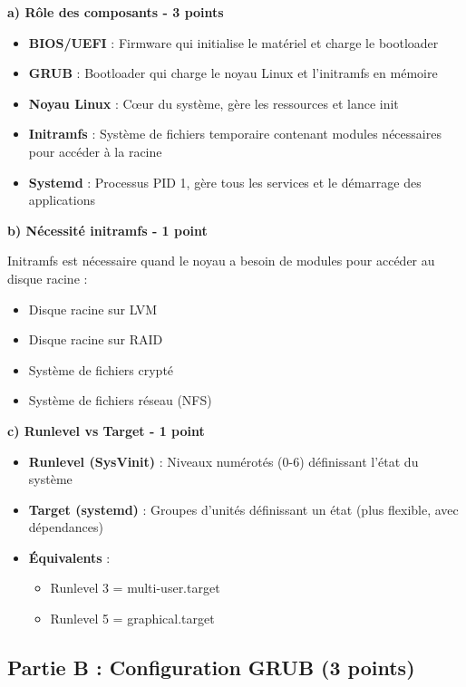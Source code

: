 \documentclass[12pt,a4paper]{article}
\begin{document}
\begin{answerbox}
\textbf{a) Rôle des composants - 3 points}

\begin{itemize}
    \item \textbf{BIOS/UEFI} : Firmware qui initialise le matériel et charge le bootloader
    \item \textbf{GRUB} : Bootloader qui charge le noyau Linux et l'initramfs en mémoire
    \item \textbf{Noyau Linux} : Cœur du système, gère les ressources et lance init
    \item \textbf{Initramfs} : Système de fichiers temporaire contenant modules nécessaires pour accéder à la racine
    \item \textbf{Systemd} : Processus PID 1, gère tous les services et le démarrage des applications
\end{itemize}

\textbf{b) Nécessité initramfs - 1 point}

Initramfs est nécessaire quand le noyau a besoin de modules pour accéder au disque racine :
\begin{itemize}
    \item Disque racine sur LVM
    \item Disque racine sur RAID
    \item Système de fichiers crypté
    \item Système de fichiers réseau (NFS)
\end{itemize}

\textbf{c) Runlevel vs Target - 1 point}

\begin{itemize}
    \item \textbf{Runlevel (SysVinit)} : Niveaux numérotés (0-6) définissant l'état du système
    \item \textbf{Target (systemd)} : Groupes d'unités définissant un état (plus flexible, avec dépendances)
    \item \textbf{Équivalents} : 
    \begin{itemize}
        \item Runlevel 3 = multi-user.target
        \item Runlevel 5 = graphical.target
    \end{itemize}
\end{itemize}
\end{answerbox}

\subsection*{Partie B : Configuration GRUB (3 points)}
\end{document}
